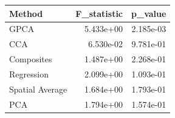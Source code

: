 \begin{tabular}{lrr}
\toprule
Method & F_statistic & p_value \\
\midrule
GPCA & 5.433e+00 & 2.185e-03 \\
CCA & 6.530e-02 & 9.781e-01 \\
Composites & 1.487e+00 & 2.268e-01 \\
Regression & 2.099e+00 & 1.093e-01 \\
Spatial Average & 1.684e+00 & 1.793e-01 \\
PCA & 1.794e+00 & 1.574e-01 \\
\bottomrule
\end{tabular}
